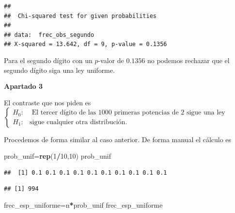 \documentclass[
]{article}
\newenvironment{Shaded}{\begin{snugshade}}{\end{snugshade}}
\newcommand{\DecValTok}[1]{\textcolor[rgb]{0.00,0.00,0.81}{#1}}
\newcommand{\KeywordTok}[1]{\textcolor[rgb]{0.13,0.29,0.53}{\textbf{#1}}}
\newcommand{\NormalTok}[1]{#1}
\newcommand{\OperatorTok}[1]{\textcolor[rgb]{0.81,0.36,0.00}{\textbf{#1}}}
\begin{document}
\begin{verbatim}
## 
##  Chi-squared test for given probabilities
## 
## data:  frec_obs_segundo
## X-squared = 13.642, df = 9, p-value = 0.1356
\end{verbatim}

Para el segundo dígito con un \(p\)-valor de \(0.1356\) no podemos
rechazar que el segundo dígito siga una ley uniforme.

\textbf{Apartado 3}

El contraste que nos piden es \[
\left\{
\begin{array}{ll}
H_0: &  \mbox{ El tercer dígito de las 1000 primeras potencias de 2 sigue una ley uniforme,}\\
H_1: & \mbox{sigue cualquier otra distribución}.
\end{array}
\right.
\]

Procedemos de forma similar al caso anterior. De forma manual el cálculo
es

\begin{Shaded}
\begin{Highlighting}[]
\NormalTok{prob\_unif=}\KeywordTok{rep}\NormalTok{(}\DecValTok{1}\OperatorTok{/}\DecValTok{10}\NormalTok{,}\DecValTok{10}\NormalTok{)}
\NormalTok{prob\_unif}
\end{Highlighting}
\end{Shaded}

\begin{verbatim}
##  [1] 0.1 0.1 0.1 0.1 0.1 0.1 0.1 0.1 0.1 0.1
\end{verbatim}

\begin{Shaded}
\end{Shaded}

\begin{verbatim}
## [1] 994
\end{verbatim}

\begin{Shaded}
\begin{Highlighting}[]
\NormalTok{frec\_esp\_uniforme=n}\OperatorTok{*}\NormalTok{prob\_unif}
\NormalTok{frec\_esp\_uniforme }
\end{Highlighting}
\end{Shaded}
\end{document}
